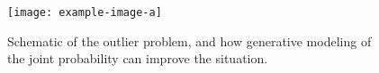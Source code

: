 \documentclass[10pt,twocolumn,letterpaper]{article}
\begin{document}
\begin{figure}[ht]
	\centering
	
	\texttt{[image: example-image-a]}
	\caption{Schematic of the outlier problem, and how generative modeling of the joint probability can improve the situation.} 
	\label{fig:schema}
\end{figure}

%
%
\end{document}
